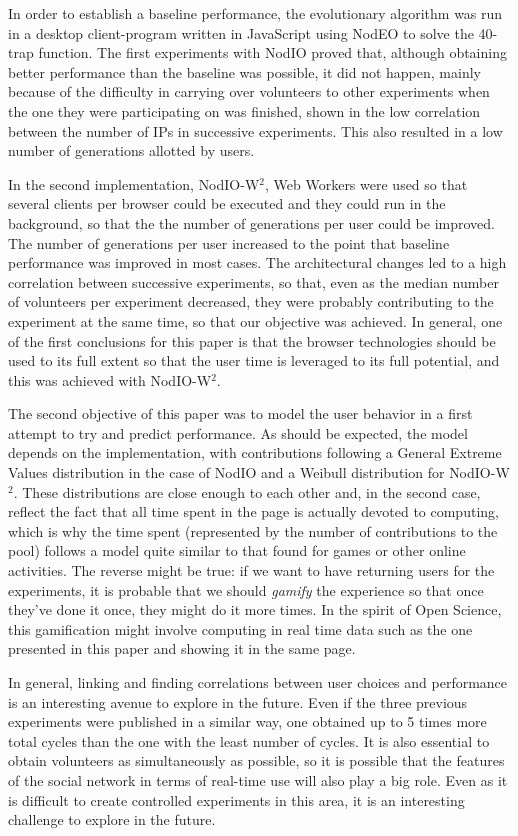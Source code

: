 \documentclass[journal,onecolumn]{IEEEtran}
\begin{document}
In order to establish a baseline performance, the evolutionary
algorithm was run in a desktop client-program written in JavaScript
using NodEO to solve the 40-trap function. The first experiments with
{\sf NodIO} proved that, although obtaining better performance than the
baseline was possible, it did not happen, mainly because of the
difficulty in carrying over volunteers to other experiments when the
one they were participating on was finished, shown in the low
correlation between the number of IPs in successive experiments. This
also resulted in a low number of generations allotted by users. 

In the second implementation, {\sf NodIO-W$^2$}, Web Workers
were used so that several clients per browser could be executed and
they could run in the background, so that the the number of
generations per user could be improved. The number of generations per
user increased to the point that baseline performance was improved in
most cases. The architectural changes led to a high correlation
between successive experiments, so that, even as the median number of
volunteers per experiment decreased, they were probably contributing
to the experiment at the same time, so that our objective was
achieved. In general, one of the first conclusions for this paper is
that the browser technologies should be used to its full extent so
that the user time is leveraged to its full potential, and this was
achieved with {\sf NodIO-W$^2$}. 

The second objective of this paper was to model the user behavior in a
first attempt to try and predict performance. As should be expected,
the model depends on the implementation, with contributions following
a General Extreme Values distribution in the case of {\sf NodIO} and a
Weibull distribution for {\sf NodIO-W$^2$}. These distributions are
close enough to each other and, in the second case, reflect the fact
that all time spent in the page is actually devoted to computing,
which is why the time spent (represented by the number of
contributions to the pool) follows a model quite similar to that found
for games or other online activities. The reverse might be true: if we
want to have returning users for the experiments, it is probable that
we should {\em gamify} the experience so that once they've done it
once, they might do it more times. In the spirit of Open Science, this
gamification might involve computing in real time data such as the one
presented in this paper and showing it in the same page. 

In general, linking and finding correlations between user choices and
performance is an interesting avenue to explore in the future. Even if
the three previous experiments were published in a similar way, one
obtained up to 5 times more total cycles  than the one with the least
number of cycles. It is also essential to obtain volunteers as
simultaneously as possible, so it is possible that the features of the
social network in terms of real-time use will also play a big
role. Even as it is difficult to create controlled experiments in this
area, it is an interesting challenge to explore in the future.
\end{document}
